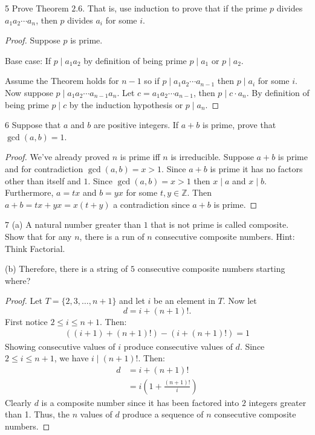 \begin{problem}{5}
    Prove Theorem $2.6$. That is, use induction to prove that if the 
    prime $p$ divides $a_1 a_2 \cdots a_n$, then $p$ divides $a_i$ for some $i$.
\end{problem}
\solved

\begin{proof}
    Suppose $p$ is prime.

    Base case: If $p \mid a_1 a_2$ by definition of being prime $p \mid a_1$ or $p \mid a_2$.

    Assume the Theorem holds for $n - 1$ so if $p \mid a_1 a_2 \cdots a_{n - 1}$ then $p \mid a_i$
    for some $i$. Now suppose $p \mid a_1 a_2 \cdots a_{n - 1} a_n$. Let $c = a_1 a_2 \cdots a_{n - 1}$,
    then $p \mid c \cdot a_n$. By definition of being prime $p \mid c$ by the induction hypothesis or $p \mid a_n$.
\end{proof}

\begin{problem}{6}
    Suppose that $a$ and $b$ are positive integers.
    If $a + b$ is prime, prove that $\gcd(a, b) = 1$.
\end{problem}
\solved

\begin{proof}
    We've already proved $n$ is prime iff $n$ is irreducible.
    Suppose $a + b$ is prime and for contradiction $\gcd(a, b) = x > 1$.
    Since $a + b$ is prime it has no factors other than itself and $1$.
    Since $\gcd(a, b) = x > 1$ then $x \mid a $ and $x \mid b$.
    Furthermore, $a = tx$ and $b = yx$ for some $t, y \in \mathbb{Z}$.
    Then $a + b = tx + yx = x(t + y)$ a contradiction since $a + b$ is prime.
\end{proof}

\begin{problem}{7}
    (a) A natural number greater than $1$ that is not prime 
    is called composite. Show that for any $n$, there is a run 
    of $n$ consecutive composite numbers. Hint: Think Factorial.
    
    (b) Therefore, there is a string of $5$ consecutive composite numbers 
        starting where?
\end{problem}
\solved

\begin{proof}
    Let $T = \{2, 3, \ldots, n + 1\}$ and let $i$ be an element in $T$.
    Now let 
    \[
        d = i + (n+1)!.
    \]
    First notice $2 \le i \le n + 1$. Then:
    \begin{align*}
        ((i + 1) + (n+1)!) - (i + (n+1)!) = 1
    \end{align*}
    Showing consecutive values of $i$ produce consecutive values of $d$. 
    Since $2 \le i \le n+1$, we have $i \mid (n+1)!$.
    Then:
    \begin{align*}
        d &= i + (n+1)! \\
          &= i \left( 1 + \frac{(n+1)!}{i} \right)
    \end{align*}
    Clearly $d$ is a composite number since it has been factored into $2$ integers greater than 1.
    Thus, the $n$ values of $d$ produce a sequence of $n$ consecutive composite numbers.
\end{proof}

